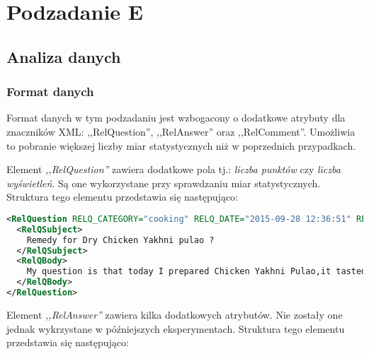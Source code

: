 \section{Podzadanie E}
\subsection{Analiza danych}
\subsubsection{Format danych}

Format danych w tym podzadaniu jest wzbogacony o dodatkowe atrybuty dla znaczników XML: ,,RelQuestion'', ,,RelAnswer'' oraz ,,RelComment''. Umożliwia to pobranie większej liczby miar statystycznych niż w poprzednich przypadkach.

Element \emph{,,RelQuestion''} zawiera dodatkowe pola tj.: \emph{liczba punktów} czy \emph{liczba wyświetleń}. Są one wykorzystane przy sprawdzaniu miar statystycznych. Struktura tego elementu przedstawia się następująco:

\begin{lstlisting}[language=XML,breaklines,label={lst:subtask_e_rel_question},caption={Przykład elementu ,,RelQuestion''.}]
<RelQuestion RELQ_CATEGORY="cooking" RELQ_DATE="2015-09-28 12:36:51" RELQ_ID="236203783777_R223248892008" RELQ_RANKING_ORDER="1" RELQ_RELEVANCE2ORGQ="Irrelevant" RELQ_SCORE="1" RELQ_TAGS="indian-cuisine, texture" RELQ_USERID="39650" RELQ_USERNAME="" RELQ_VIEWCOUNT="82">
  <RelQSubject>
    Remedy for Dry Chicken Yakhni pulao ?
  </RelQSubject>
  <RelQBody>
    My question is that today I prepared Chicken Yakhni Pulao,it tasted good but it is very dry, i mean the youghurt and the masala got absorbed in the rice very much. And i have made lots of it, it is also fully cooked. So does anyone know how should i make the fully cooked pulao little juicy ? As it is difficult to eat the dry pulao(I may require another curry with it)
  </RelQBody>
</RelQuestion>
\end{lstlisting}

Element \emph{,,RelAnswer''} zawiera kilka dodatkowych atrybutów. Nie zostały one jednak wykrzystane w późniejszych eksperymentach. Struktura tego elementu przedstawia się następująco:


